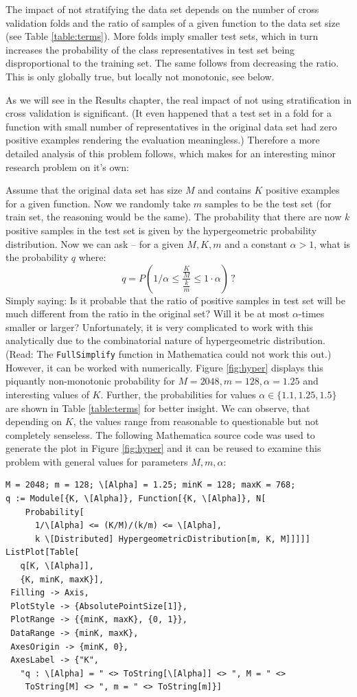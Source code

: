 \documentclass[11pt,twoside,a4paper]{book}
\begin{document}
The impact of not stratifying the data set depends on the number of cross validation folds
and the ratio of samples of a given function to the data set size (see Table \ref{table:terms}).
More folds imply smaller test sets, 
which in turn increases the probability of the class representatives in test set
being disproportional to the training set.
The same follows from decreasing the ratio.
This is only globally true, but locally not monotonic, see below.

As we will see in the Results chapter, the real impact of not using stratification
in cross validation is significant.
(It even happened that a test set in a fold for a function with small number of representatives in
the original data set had zero positive examples rendering the evaluation meaningless.)
Therefore a more detailed analysis of this problem follows,
which makes for an interesting minor research problem on it's own:

Assume that the original data set has size $M$ and contains $K$
positive examples for a given function.
Now we randomly take $m$ samples to be the test set (for train set, the reasoning would be the same).
The probability that there are now $k$ positive samples 
in the test set is given by the hypergeometric probability distribution.
Now we can ask -- for a given $M, K, m$ and a constant $\alpha > 1$, what is the probability $q$ where:
\[ q = P\left(1 / \alpha \le \frac{\frac{K}{M}}{\frac{k}{m}} \le 1 \cdot \alpha \right) \,  ? \]
Simply saying: Is it probable that the ratio of positive samples in test set will be much different
from the ratio in the original set? 
Will it be at most $\alpha$-times smaller or larger?
Unfortunately, it is very complicated to work with this analytically due to the combinatorial 
nature of hypergeometric distribution.
(Read: The \texttt{FullSimplify} function in Mathematica could not work this out.)
However, it can be worked with numerically.
Figure \ref{fig:hyper} displays this piquantly non-monotonic probability for $M = 2048, m = 128, \alpha = 1.25$ and interesting 
values of $K$.
Further, the probabilities for values $\alpha \in \{1.1, 1.25, 1.5\}$ are shown in Table \ref{table:terms} 
for better insight.
We can observe, that depending on $K$, the values range from reasonable to questionable but not completely senseless.
The following Mathematica source code was used to generate the plot in Figure \ref{fig:hyper}
and it can be reused to examine this problem with general values for parameters $M,m,\alpha$:
\begin{verbatim}
M = 2048; m = 128; \[Alpha] = 1.25; minK = 128; maxK = 768;
q := Module[{K, \[Alpha]}, Function[{K, \[Alpha]}, N[
    Probability[
      1/\[Alpha] <= (K/M)/(k/m) <= \[Alpha],
      k \[Distributed] HypergeometricDistribution[m, K, M]]]]] 
ListPlot[Table[
   q[K, \[Alpha]],
   {K, minK, maxK}],
 Filling -> Axis,
 PlotStyle -> {AbsolutePointSize[1]},
 PlotRange -> {{minK, maxK}, {0, 1}},
 DataRange -> {minK, maxK},
 AxesOrigin -> {minK, 0},
 AxesLabel -> {"K", 
   "q : \[Alpha] = " <> ToString[\[Alpha]] <> ", M = " <> 
    ToString[M] <> ", m = " <> ToString[m]}]
\end{verbatim}
\end{document}
